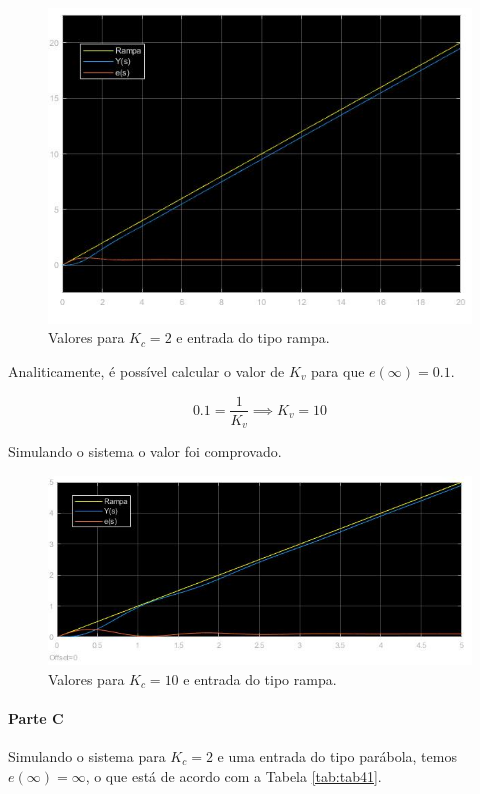 \documentclass[
]{book}
\theoremstyle{definition}
\theoremstyle{definition}
\theoremstyle{definition}
\theoremstyle{remark}
\begin{document}
\begin{figure}
\includegraphics[width=0.8\linewidth]{Imagens/Lab4/Resolução/prob2B1} \caption{Valores para $K_c = 2$ e entrada do tipo rampa.}\label{fig:fig42B1}
\end{figure}

Analiticamente, é possível calcular o valor de \(K_v\) para que \(e(\infty) = 0.1\).

\[
0.1 = \frac {1}{K_v} \implies K_v = 10
\]

Simulando o sistema o valor foi comprovado.

\begin{figure}
\includegraphics[width=0.8\linewidth]{Imagens/Lab4/Resolução/prob2B2} \caption{Valores para $K_c = 10$ e entrada do tipo rampa.}\label{fig:fig42B2}
\end{figure}

\hypertarget{parte-c-1}{%
\paragraph{Parte C}\label{parte-c-1}}

Simulando o sistema para \(K_c = 2\) e uma entrada do tipo parábola, temos \(e(\infty) = \infty\), o que está de acordo com a Tabela \ref{tab:tab41}.
\end{document}

